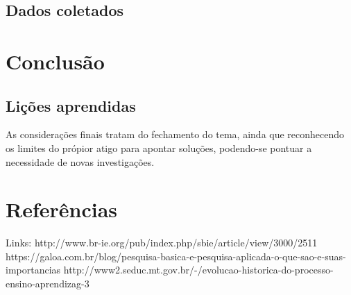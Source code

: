 \documentclass[12pt]{article}
\begin{document}
	\subsection{Dados coletados} %
	
	
	\section{Conclusão}
	\subsection{Lições aprendidas}
		As considerações finais tratam do fechamento do tema, ainda que reconhecendo os limites do própior atigo para apontar soluções, podendo-se pontuar a necessidade de novas investigações.
	
	
	
	\section{Referências} 
	
	Links: http://www.br-ie.org/pub/index.php/sbie/article/view/3000/2511
			https://galoa.com.br/blog/pesquisa-basica-e-pesquisa-aplicada-o-que-sao-e-suas-importancias
			http://www2.seduc.mt.gov.br/-/evolucao-historica-do-processo-ensino-aprendizag-3
	
	
	
\end{document}
